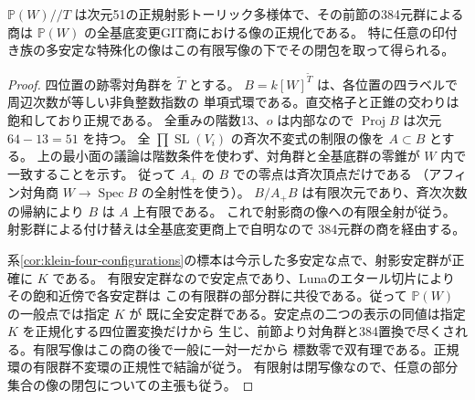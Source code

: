 \begin{theorem}\label{thm:klein-toric-normalization}
$\mathbb P(W)//T$ は次元51の正規射影トーリック多様体で、その前節の384元群による商は
$\mathbb P(W)$ の全基底変更GIT商における像の正規化である。
特に任意の印付き族の多安定な特殊化の像はこの有限写像の下でその閉包を取って得られる。
\end{theorem}
\begin{proof}
四位置の跡零対角群を $\widetilde T$ とする。
$B=k[W]^{\widetilde T}$ は、各位置の四ラベルで周辺次数が等しい非負整数指数の
単項式環である。直交格子と正錐の交わりは飽和しており正規である。
全重みの階数13、$o$ は内部なので $\operatorname{Proj} B$ は次元 $64-13=51$ を持つ。
全 $\prod\operatorname{SL}(V_i)$ の斉次不変式の制限の像を $A\subset B$ とする。
上の最小面の議論は階数条件を使わず、対角群と全基底群の零錐が $W$ 内で一致することを示す。
従って $A_+$ の $B$ での零点は斉次頂点だけである
（アフィン対角商 $W\to\operatorname{Spec}B$ の全射性を使う）。
$B/A_+B$ は有限次元であり、斉次次数の帰納により $B$ は $A$ 上有限である。
これで射影商の像への有限全射が従う。射影群による付け替えは全基底変更商上で自明なので
384元群の商を経由する。

系\ref{cor:klein-four-configurations}の標本は今示した多安定な点で、射影安定群が正確に $K$ である。
有限安定群なので安定点であり、Lunaのエタール切片によりその飽和近傍で各安定群は
この有限群の部分群に共役である。従って $\mathbb P(W)$ の一般点では指定 $K$ が
既に全安定群である。安定点の二つの表示の同値は指定 $K$ を正規化する四位置変換だけから
生じ、前節より対角群と384置換で尽くされる。有限写像はこの商の後で一般に一対一だから
標数零で双有理である。正規環の有限群不変環の正規性で結論が従う。
有限射は閉写像なので、任意の部分集合の像の閉包についての主張も従う。
\end{proof}
